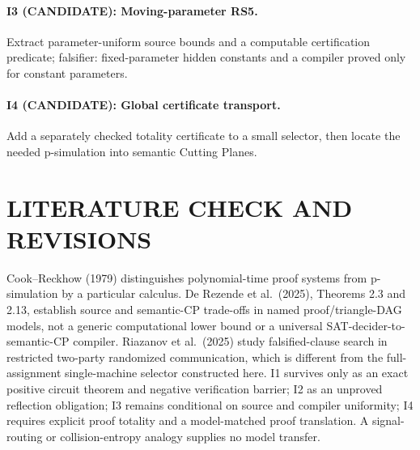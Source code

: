 \documentclass[11pt]{article}
\begin{document}
\paragraph{I3 (CANDIDATE): Moving-parameter RS5.}
Extract parameter-uniform source bounds and a computable certification
predicate; falsifier: fixed-parameter hidden constants and a compiler
proved only for constant parameters.
\paragraph{I4 (CANDIDATE): Global certificate transport.}
Add a separately checked totality certificate to a small selector,
then locate the needed p-simulation into semantic Cutting Planes.

\section{LITERATURE CHECK AND REVISIONS}
Cook--Reckhow (1979) distinguishes polynomial-time proof systems from
p-simulation by a particular calculus. De Rezende et al.\ (2025),
Theorems 2.3 and 2.13, establish source and semantic-CP trade-offs in
named proof/triangle-DAG models, not a generic computational lower
bound or a universal SAT-decider-to-semantic-CP compiler.
Riazanov et al.\ (2025) study falsified-clause search in restricted
two-party randomized communication, which is different from the
full-assignment single-machine selector constructed here.
I1 survives only as an exact positive circuit theorem and negative
verification barrier; I2 as an unproved reflection obligation;
I3 remains conditional on source and compiler uniformity; I4
requires explicit proof totality and a model-matched proof translation.
A signal-routing or collision-entropy analogy supplies no model transfer.
\end{document}
